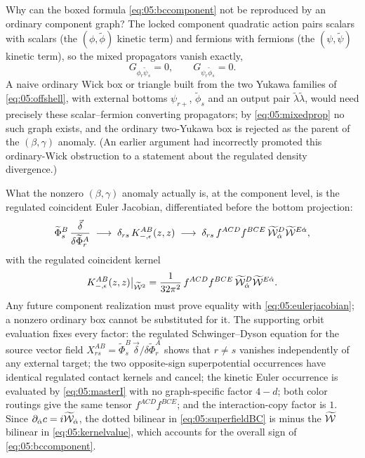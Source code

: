 Why can the boxed formula \eqref{eq:05:bccomponent} not be reproduced by an
ordinary component graph? The locked component quadratic action pairs scalars
with scalars (the $(\phi,\widetilde\phi)$ kinetic term) and fermions with
fermions (the $(\psi,\widetilde\psi)$ kinetic term), so the mixed propagators
vanish exactly,
\begin{equation}\label{eq:05:mixedprop}
G_{\phi_r\widetilde\psi_s}=0,\qquad G_{\psi_r\widetilde\phi_s}=0.
\end{equation}
A naive ordinary Wick box or triangle built from the two Yukawa families of
\eqref{eq:05:offshell}, with external bottoms $\psi_{r+}$, $\widetilde\phi_s$
and an output pair $\widetilde\lambda\widetilde\lambda$, would need precisely
these scalar--fermion converting propagators; by \eqref{eq:05:mixedprop} no
such graph exists, and the ordinary two-Yukawa box is rejected as the parent of
the $(\beta,\gamma)$ anomaly. (An earlier argument had incorrectly promoted
this ordinary-Wick obstruction to a statement about the regulated density
divergence.)

What the nonzero $(\beta,\gamma)$ anomaly actually is, at the component level,
is the regulated coincident Euler Jacobian, differentiated before the bottom
projection:
\begin{equation}\label{eq:05:eulerjacobian}
\widetilde\Phi_s^{B}\,\frac{\vec\delta}{\delta\widetilde\Phi_r^{A}}
\;\longrightarrow\;\delta_{rs}\,K_{-,\epsilon}^{AB}(z,z)
\;\longrightarrow\;\delta_{rs}\,f^{ACD}f^{BCE}\,\widetilde{\mathcal{W}}_{\dot\alpha}^{D}\widetilde{\mathcal{W}}^{E\dot\alpha},
\end{equation}
with the regulated coincident kernel
\begin{equation}\label{eq:05:kernelvalue}
K_{-,\epsilon}^{AB}(z,z)\big|_{\widetilde{\mathcal{W}}^{2}}
=\frac{1}{32\pi^{2}}\,f^{ACD}f^{BCE}\,\widetilde{\mathcal{W}}_{\dot\alpha}^{D}\widetilde{\mathcal{W}}^{E\dot\alpha}.
\end{equation}
Any future component realization must prove equality with
\eqref{eq:05:eulerjacobian}; a nonzero ordinary box cannot be substituted for
it. The supporting orbit evaluation fixes every factor: the regulated
Schwinger--Dyson equation for the source vector field
$X_{rs}^{AB}=\widetilde\Phi_s^{B}\,\vec\delta/\delta\widetilde\Phi_r^{A}$
shows that $r\neq s$ vanishes independently of any external target; the two
opposite-sign superpotential occurrences have identical regulated contact
kernels and cancel; the kinetic Euler occurrence is evaluated by
\eqref{eq:05:masterI} with no graph-specific factor $4-d$; both color routings
give the same tensor $f^{ACD}f^{BCE}$; and the interaction-copy factor is $1$.
Since $\partial_{\dot\alpha}c=i\widetilde{\mathcal{W}}_{\dot\alpha}$, the dotted bilinear in
\eqref{eq:05:superfieldBC} is minus the $\widetilde{\mathcal{W}}$ bilinear in
\eqref{eq:05:kernelvalue}, which accounts for the overall sign of
\eqref{eq:05:bccomponent}.


